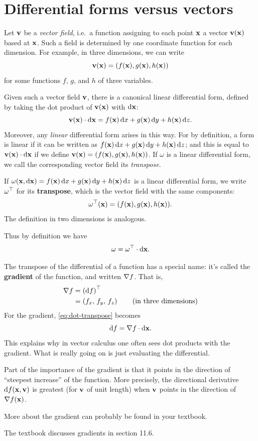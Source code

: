 \documentclass[12pt]{amsart}
\begin{document}
\section{Differential forms versus vectors}
\label{sec:forms-vs-vectors}

Let $\mathbf{v}$ be a \emph{vector field}, i.e.\ a function assigning to each point $\mathbf{x}$ a vector $\mathbf{v}(\mathbf{x})$ based at $\mathbf{x}$.
Such a field is determined by one coordinate function for each dimension.
For example, in three dimensions, we can write
\[ \mathbf{v}(\mathbf{x}) = (f(\mathbf{x}),g(\mathbf{x}),h(\mathbf{x})) \]
for some functions $f$, $g$, and $h$ of three variables.

Given such a vector field $\mathbf{v}$, there is a canonical linear differential form, defined by taking the dot product of $\mathbf{v}(\mathbf{x})$ with ${\mathrm{d} \mathbf{x}}$:
\[ \mathbf{v}(\mathbf{x}) \cdot {\ensuremath{\mathrm{d} \mathbf{x}}} = f(\mathbf{x})\,{\mathrm{d} x} + g(\mathbf{x})\,{\mathrm{d} y} + h(\mathbf{x})\,{\mathrm{d} z}. \]
Moreover, any \emph{linear} differential form arises in this way.
For by definition, a form is linear if it can be written as $f(\mathbf{x})\,{\mathrm{d} x} + g(\mathbf{x})\,{\mathrm{d} y} + h(\mathbf{x})\,{\mathrm{d} z}$; and this is equal to $\mathbf{v}(\mathbf{x}) \cdot {\ensuremath{\mathrm{d} \mathbf{x}}}$ if we define $\mathbf{v}(\mathbf{x}) = (f(\mathbf{x}),g(\mathbf{x}),h(\mathbf{x}))$.
If $\omega$ is a linear differential form, we call the corresponding vector field its \emph{transpose}.

\begin{defn}
  If $\omega(\mathbf{x},{\mathrm{d} \mathbf{x}}) = f(\mathbf{x})\,{\mathrm{d} x} + g(\mathbf{x})\,{\mathrm{d} y} + h(\mathbf{x})\,{\mathrm{d} z}$ is a linear differential form, we write ${\omega}^\top$ for its \textbf{transpose}, which is the vector field with the same components:
  \[ {\omega}^\top(\mathbf{x}) = (f(\mathbf{x}), g(\mathbf{x}), h(\mathbf{x})). \]
  The definition in two dimensions is analogous.
\end{defn}

Thus by definition we have
\begin{equation}\label{eq:dot-transpose}
  \omega = {\omega}^\top \cdot {\ensuremath{\mathrm{d} \mathbf{x}}}.
\end{equation}

The transpose of the differential of a function has a special name: it's called the \textbf{gradient} of the function, and written $\nabla f$.
That is,
\begin{align*}
  \nabla f &= {({\mathrm{d} f})}^\top\\
  &= \left({f}_{x},\,{f}_{y},\,{f}_{z}\right) \qquad\text{(in three dimensions)}
\end{align*}
For the gradient, \cref{eq:dot-transpose} becomes
\[ {\mathrm{d} f} = \nabla f \cdot {\ensuremath{\mathrm{d} \mathbf{x}}}. \]
This explains why in vector calculus one often sees dot products with the gradient.
What is really going on is just evaluating the differential.

Part of the importance of the gradient is that it points in the direction of ``steepest increase'' of the function.
More precisely, the directional derivative ${\mathrm{d} f}(\mathbf{x},\mathbf{v})$ is greatest (for $\mathbf{v}$ of unit length) when $\mathbf{v}$ points in the direction of $\nabla f(\mathbf{x})$.
\begin{notextbook}More about the gradient can probably be found in your textbook.\end{notextbook}%
\begin{stewart}The textbook discusses gradients in section 11.6.\end{stewart}
\end{document}
